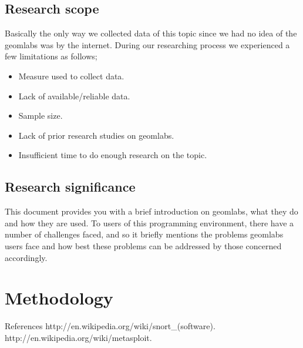 \documentclass {article}
\begin{document}
\subsection {Research scope}
Basically the only way we collected data of this topic since we had no idea of the geomlabs was by the internet. During our researching process we experienced a few limitations as follows;
\begin{itemize}
\item Measure used to collect data.
\item Lack of available/reliable data.
\item Sample size. 
\item Lack of prior research studies on geomlabs.
\item Insufficient time to do enough research on the topic.
\end{itemize}
\subsection {Research significance}
This document provides you with a brief introduction on geomlabs, what they do and how they are used. To users of this programming environment, there have a number of challenges faced, and so it briefly mentions the problems geomlabs users face and how best these problems can be addressed by those concerned accordingly. 
\section{ Methodology}
{ References}
 http://en.wikipedia.org/wiki/snort_(software).
 \newline http://en.wikipedia.org/wiki/metasploit.
\end{document}
